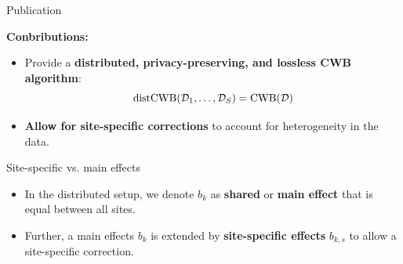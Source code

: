 \documentclass[t,10pt]{beamer}
\begin{document}
\begin{frame}{Publication \citep{schalk2022distcwb}}
  \vspace{-0.2cm}
  \begin{figure}
    \centering
  \end{figure}
  \vspace{-0.2cm}
  \textbf{Conbributions:}
  \begin{itemize}
    \item
      Provide a \textbf{distributed, privacy-preserving, and lossless CWB algorithm}: \[\operatorname{distCWB}(\mathcal{D}_1, \dots, \mathcal{D}_S) = \operatorname{CWB}(\mathcal{D})\]
    \item
      \textbf{Allow for site-specific corrections} to account for heterogeneity in the data.
  \end{itemize}

\end{frame}

\begin{frame}{Site-specific vs. main effects}
  \begin{itemize}
    \item
      In the distributed setup, we denote $b_k$ as \textbf{shared} or \textbf{main effect} that is equal between all sites.
    \item
      Further, a main effects $b_k$ is extended by \textbf{site-specific effects} $b_{k,s}$ to allow a site-specific correction.
  \end{itemize}
\end{frame}
\end{document}
